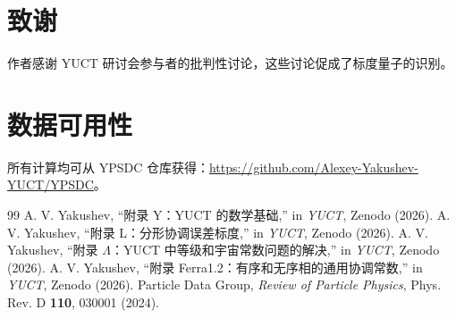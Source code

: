 \documentclass[12pt,a4paper]{article}
\begin{document}
	\section*{致谢}
	
	作者感谢 YUCT 研讨会参与者的批判性讨论，这些讨论促成了标度量子的识别。
	
	\section*{数据可用性}
	
	所有计算均可从 YPSDC 仓库获得：\url{https://github.com/Alexey-Yakushev-YUCT/YPSDC}。
	
	\begin{thebibliography}{99}
		 A. V. Yakushev, ``附录 Y：YUCT 的数学基础,'' in \emph{YUCT}, Zenodo (2026).
		 A. V. Yakushev, ``附录 L：分形协调误差标度,'' in \emph{YUCT}, Zenodo (2026).
		 A. V. Yakushev, ``附录 \(\Lambda\)：YUCT 中等级和宇宙常数问题的解决,'' in \emph{YUCT}, Zenodo (2026).
		 A. V. Yakushev, ``附录 Ferra1.2：有序和无序相的通用协调常数,'' in \emph{YUCT}, Zenodo (2026).
		 Particle Data Group, \emph{Review of Particle Physics}, Phys. Rev. D \textbf{110}, 030001 (2024).
	\end{thebibliography}
	
\end{document}
